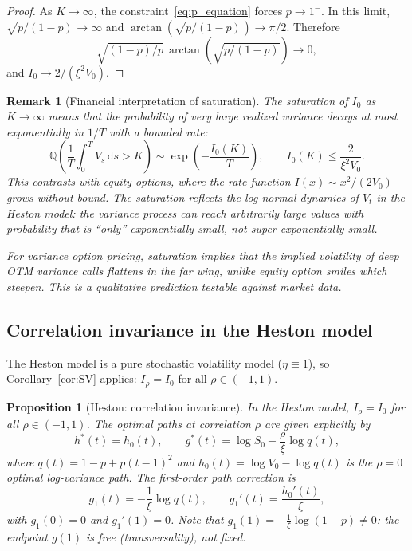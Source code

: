 \documentclass[11pt]{article}
\newtheorem{proposition}[theorem]{Proposition}
\newtheorem{remark}[theorem]{Remark}
\theoremstyle{definition}
\newcommand{\dd}{\mathrm{d}}
\newcommand{\Q}{\mathbb{Q}}
\begin{document}
\begin{proof}
As $K \to \infty$, the constraint~\eqref{eq:p_equation} forces $p \to 1^-$. In this limit, $\sqrt{p/(1-p)} \to \infty$ and $\arctan(\sqrt{p/(1-p)}) \to \pi/2$. Therefore
\begin{equation}
  \sqrt{(1-p)/p}\,\arctan(\sqrt{p/(1-p)}) \to 0,
\end{equation}
and $I_0 \to 2/(\xi^2 V_0)$.
\end{proof}

\begin{remark}[Financial interpretation of saturation]\label{rem:saturation}
The saturation of $I_0$ as $K \to \infty$ means that the probability of very large realized variance decays at most exponentially in $1/T$ with a \emph{bounded} rate:
\begin{equation}
  \Q\!\left(\frac{1}{T}\int_0^T V_s\,\dd s > K\right) \sim \exp\!\left(-\frac{I_0(K)}{T}\right), \qquad I_0(K) \leq \frac{2}{\xi^2 V_0}.
\end{equation}
This contrasts with equity options, where the rate function $I(x) \sim x^2/(2V_0)$ grows without bound. The saturation reflects the log-normal dynamics of $V_t$ in the Heston model: the variance process can reach arbitrarily large values with probability that is ``only'' exponentially small, not super-exponentially small.

For variance option pricing, saturation implies that the implied volatility of deep OTM variance calls \emph{flattens} in the far wing, unlike equity option smiles which steepen. This is a qualitative prediction testable against market data.
\end{remark}

\subsection{Correlation invariance in the Heston model}\label{sec:heston_I2}

The Heston model is a pure stochastic volatility model ($\eta \equiv 1$), so Corollary~\ref{cor:SV} applies: $I_\rho = I_0$ for all $\rho \in (-1,1)$.

\begin{proposition}[Heston: correlation invariance]\label{prop:heston_I2}
In the Heston model, $I_\rho = I_0$ for all $\rho \in (-1,1)$. The optimal paths at correlation $\rho$ are given explicitly by
\begin{equation}\label{eq:h_rho_heston}
  h^*(t) = h_0(t), \qquad g^*(t) = \log S_0 - \frac{\rho}{\xi}\log q(t),
\end{equation}
where $q(t) = 1 - p + p(t-1)^2$ and $h_0(t) = \log V_0 - \log q(t)$ is the $\rho=0$ optimal log-variance path. The first-order path correction is
\begin{equation}\label{eq:g1_heston}
  g_1(t) = -\frac{1}{\xi}\log q(t), \qquad g_1'(t) = \frac{h_0'(t)}{\xi},
\end{equation}
with $g_1(0) = 0$ and $g_1'(1) = 0$. Note that $g_1(1) = -\frac{1}{\xi}\log(1-p) \neq 0$: the endpoint $g(1)$ is free (transversality), not fixed.
\end{proposition}
\end{document}
